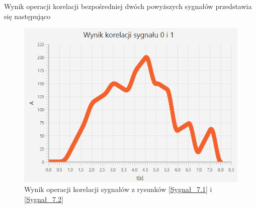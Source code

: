 \documentclass[12pt]{article}
\begin{document}
Wynik operacji korelacji bezpośredniej dwóch powyższych sygnałów przedstawia się następująco
\begin{figure}[H]
    \centering
	\includegraphics[width=\linewidth]{Korelacja_7.1.png}
    \caption{Wynik operacji korelacji sygnałów z rysunków \ref{Sygnał_7.1} i \ref{Sygnał_7.2}}
    \label{Wynik_7.1}
\end{figure}

\end{document}
